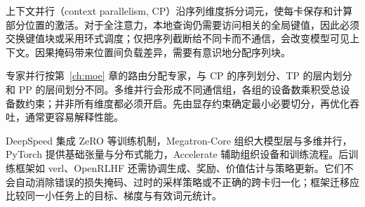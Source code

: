 上下文并行（context parallelism, CP）沿序列维度拆分词元，使每卡保存和计算部分位置的激活。对于全注意力，本地查询仍需要访问相关的全局键值，因此必须交换键值块或采用环式调度；仅把序列截断给不同卡而不通信，会改变模型可见上下文。因果掩码带来位置间负载差异，需要有意识地分配序列块。

专家并行按第~\ref{ch:moe} 章的路由分配专家，与 CP 的序列划分、TP 的层内划分和 PP 的层间划分不同。多维并行会形成不同通信组，各组的设备数乘积受总设备数约束；并非所有维度都必须开启。先由显存约束确定最小必要切分，再优化吞吐，通常更容易解释性能。

DeepSpeed 集成 ZeRO 等训练机制，Megatron-Core 组织大模型层与多维并行，PyTorch 提供基础张量与分布式能力，Accelerate 辅助组织设备和训练流程。后训练框架如 verl、OpenRLHF 还需协调生成、奖励、价值估计与策略更新。它们不会自动消除错误的损失掩码、过时的采样策略或不正确的跨卡归一化；框架迁移应比较同一小任务上的目标、梯度与有效词元统计。

